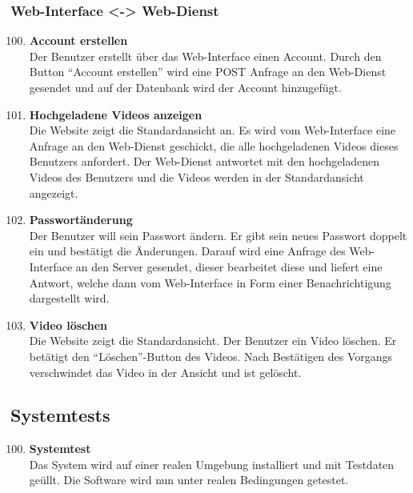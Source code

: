 \subsubsection{Web-Interface <-> Web-Dienst}
\begin{enumerate}[\bfseries{T}10]  
\setcounter{enumi}{99}{}

\item \textbf{Account erstellen} \hfill\\
Der Benutzer erstellt \"uber das Web-Interface einen Account. Durch den Button ``Account erstellen'' wird eine POST Anfrage an den Web-Dienst gesendet und auf der Datenbank wird der Account hinzugef\"ugt.

\item \textbf{Hochgeladene Videos anzeigen} \hfill\\
Die Website zeigt die Standardansicht an. Es wird vom Web-Interface eine Anfrage an den Web-Dienst geschickt, die alle hochgeladenen Videos dieses Benutzers anfordert. Der Web-Dienst antwortet mit den hochgeladenen Videos des Benutzers und die Videos werden in der Standardansicht angezeigt. 

\item \textbf{Passwort\"anderung} \hfill\\
Der Benutzer will sein Passwort \"andern. Er gibt sein neues Passwort doppelt ein und best\"atigt die \"Anderungen. Darauf wird eine Anfrage des Web-Interface an den Server gesendet, dieser bearbeitet diese und liefert eine Antwort, welche dann vom Web-Interface in Form einer Benachrichtigung dargestellt wird.

\item \textbf{Video l\"oschen} \hfill\\
Die Website zeigt die Standardansicht. Der Benutzer ein Video l\"oschen. Er bet\"atigt den ``L\"oschen''-Button des Videos. Nach Best\"atigen des Vorgangs verschwindet das Video in der Ansicht und ist gel\"oscht.

\end{enumerate}

\subsection{Systemtests}
\begin{enumerate}[\bfseries{T}10]  
\setcounter{enumi}{99}{}

\item \textbf{Systemtest} \hfill\\  
Das System wird auf einer realen Umgebung installiert und mit Testdaten ge\"ullt. Die Software wird nun unter realen Bedingungen getestet.
\end{enumerate}
